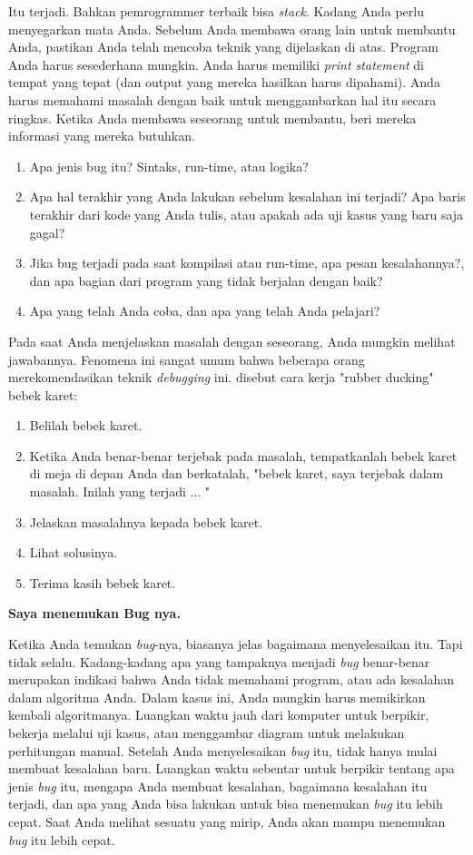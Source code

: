 \documentclass[12pt,b5paper,openright,twoside]{book}
\begin{document}
\noindent Itu terjadi. Bahkan pemrogrammer terbaik bisa \textit{stack}. Kadang Anda perlu menyegarkan mata Anda. Sebelum Anda membawa orang lain untuk membantu Anda, pastikan Anda telah mencoba teknik yang dijelaskan di atas. Program Anda harus sesederhana mungkin. Anda harus memiliki \textit{print statement} di tempat yang tepat (dan output yang mereka hasilkan harus dipahami). Anda harus memahami masalah dengan baik untuk menggambarkan hal itu secara ringkas.
Ketika Anda membawa seseorang untuk membantu, beri mereka informasi yang mereka butuhkan.
\begin{enumerate}
    \item Apa jenis bug itu? Sintaks, run-time, atau logika?
    \item Apa hal terakhir yang Anda lakukan sebelum kesalahan ini terjadi? Apa baris terakhir dari kode yang Anda tulis, atau apakah ada uji kasus yang baru saja gagal?
    \item Jika bug terjadi pada saat kompilasi atau run-time, apa pesan kesalahannya?, dan apa bagian dari program yang tidak berjalan dengan baik?
    \item Apa yang telah Anda coba, dan apa yang telah Anda pelajari?
\end{enumerate}

\noindent Pada saat Anda menjelaskan masalah dengan seseorang, Anda mungkin melihat jawabannya. Fenomena ini sangat umum bahwa beberapa orang merekomendasikan teknik \textit{debugging} ini. disebut cara kerja "rubber ducking" bebek karet:
\begin{enumerate}
    \item Belilah bebek karet.
    \item Ketika Anda benar-benar terjebak pada masalah, tempatkanlah bebek karet di meja di depan Anda dan berkatalah, "bebek karet, saya terjebak dalam masalah. Inilah yang terjadi ... "
    \item Jelaskan masalahnya kepada bebek karet.
    \item Lihat solusinya.
    \item Terima kasih bebek karet.
\end{enumerate}

\noindent \textbf{Saya menemukan Bug nya.}

\noindent Ketika Anda temukan \textit{bug}-nya, biasanya jelas bagaimana menyelesaikan itu. Tapi tidak selalu. Kadang-kadang apa yang tampaknya menjadi \textit{bug} benar-benar merupakan indikasi bahwa Anda tidak memahami program, atau ada kesalahan dalam algoritma Anda. Dalam kasus ini, Anda mungkin harus memikirkan kembali algoritmanya. Luangkan waktu jauh dari komputer untuk berpikir, bekerja melalui uji kasus, atau menggambar diagram untuk melakukan perhitungan manual.
Setelah Anda menyelesaikan \textit{bug} itu, tidak hanya mulai membuat kesalahan baru. Luangkan waktu sebentar untuk berpikir tentang apa jenis \textit{bug} itu, mengapa Anda membuat kesalahan, bagaimana kesalahan itu terjadi, dan apa yang Anda bisa lakukan untuk bisa menemukan \textit{bug} itu lebih cepat. Saat Anda melihat sesuatu yang mirip, Anda akan mampu menemukan \textit{bug} itu lebih cepat.
\end{document}
